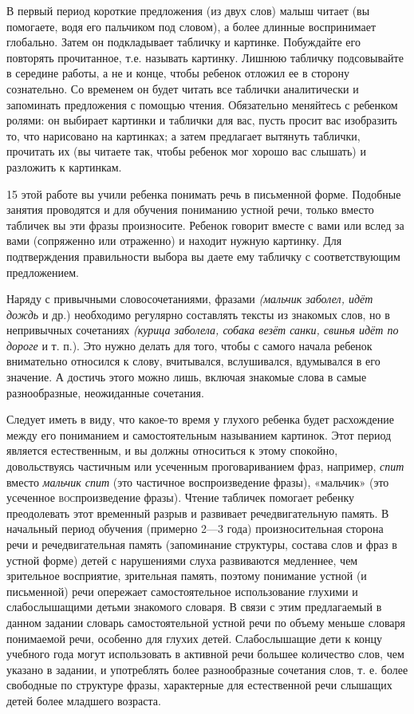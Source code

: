 \documentclass{book}
\renewcommand{\emph}[1]{\textit{#1}}
\begin{document}
В первый период короткие предложения (из двух слов) малыш читает (вы
помогаете, водя его пальчиком под словом), а более длинные воспринимает
глобально. Затем он подкладывает табличку и картинке. Побуждайте его
повторять прочитанное, т.е. называть картинку. Лишнюю табличку
подсовывайте в середине работы, а не и конце, чтобы ребенок отложил ее в
сторону сознательно. Со временем он будет читать все таблички
аналитически и запоминать предложения с помощью чтения. Обязательно
меняйтесь с ребенком ролями: он выбирает картинки и таблички для вас,
пусть просит вас изобразить то, что нарисовано на картинках; а затем
предлагает вытянуть таблички, прочитать их (вы читаете так, чтобы
ребенок мог хорошо вас слышать) и разложить к картинкам.

15 этой работе вы учили ребенка понимать речь в письменной форме.
Подобные занятия проводятся и для обучения пониманию устной речи, только
вместо табличек вы эти фразы произносите. Ребенок говорит вместе с вами
или вслед за вами (сопряженно или отраженно) и находит нужную картинку.
Для подтверждения правильности выбора вы даете ему табличку с
соответствующим предложением.

Наряду с привычными словосочетаниями, фразами \emph{(мальчик заболел,
идёт дождь} и др.) необходимо регулярно составлять тексты из знакомых
слов, но в непривычных сочетаниях \emph{(курица заболела, собака везёт
санки, свинья идёт по дороге} и т. п.). Это нужно делать для того, чтобы
с самого начала ребенок внимательно относился к слову, вчитывался,
вслушивался, вдумывался в его значение. А достичь этого можно лишь,
включая знакомые слова в самые разнообразные, неожиданные сочетания.

Следует иметь в виду, что какое-то время у глухого ребенка будет
расхождение между его пониманием и самостоятельным называнием картинок.
Этот период является естественным, и вы должны относиться к этому
спокойно, довольствуясь частичным или усеченным проговариванием фраз,
например, \emph{спит} вместо \emph{мальчик спит} (это частичное
воспроизведение фразы), «мальчик» (это усеченное
\textsc{вос}произведение фразы). Чтение табличек помогает ребенку
преодолевать этот временный разрыв и развивает речедвигательную память.
В начальный период обучения (примерно 2---3 года) произносительная
сторона речи и речедвигательная память (запоминание структуры, состава
слов и фраз в устной форме) детей с нарушениями слуха развиваются
медленнее, чем зрительное восприятие, зрительная память, поэтому
понимание устной (и письменной) речи опережает самостоятельное
использование глухими и слабослышащими детьми знакомого словаря. В связи
с этим предлагаемый в данном задании словарь самостоятельной устной речи
по объему меньше словаря понимаемой речи, особенно для глухих детей.
Слабослышащие дети к концу учебного года могут использовать в активной
речи большее количество слов, чем указано в задании, и употреблять более
разнообразные сочетания слов, т. е. более свободные по структуре фразы,
характерные для естественной речи слышащих детей более младшего
возраста.
\end{document}
